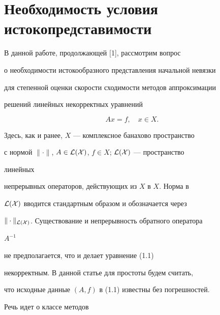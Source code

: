 \pagestyle{plain} %







\maketitle


\label{begin}








\section{Необходимость условия истокопредставимости}





В данной работе, продолжающей [1], рассмотрим вопрос 


о необходимости истокообразного представления начальной невязки 


для степенной оценки скорости сходимости методов аппроксимации 


решений линейных некорректных уравнений


\begin{equation}


A x=f,\quad x\in X.


\end{equation}


Здесь, как и ранее, $X$ --- комплексное банахово пространство


с нормой $\|\cdot\|$, $A\in {\cal L(X)}$, $f\in X$; ${\cal L(X)}$ --- пространство 


линейных


непрерывных операторов, действующих из $X$ в $X$. Норма в 


${\cal L(X)}$ вводится стандартным образом и обозначается через


$\|\cdot\|_{\cal L(X)}$. Существование и непрерывность обратного оператора 


$A^{-1}$


не предполагается, что и делает уравнение (1.1) 


некорректным. В данной статье для простоты будем считать, 


что исходные данные $(A,f)$ в (1.1) известны без погрешностей. 


Речь идет о классе методов


